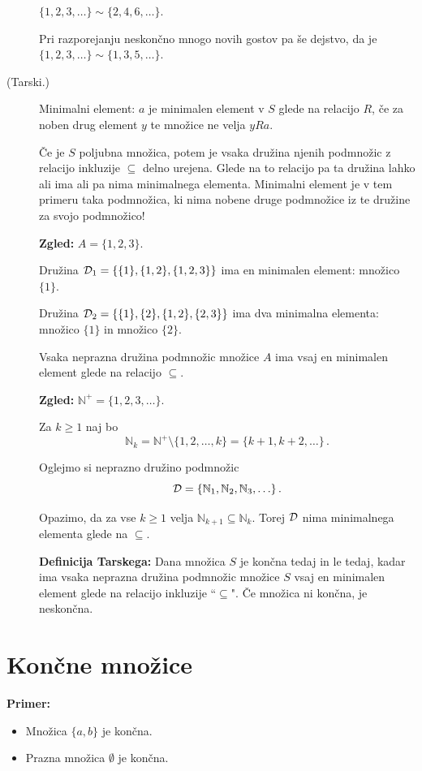 \documentclass[11pt,paper=b5,footinclude,headinclude]{scrbook} %
\begin{document}
\begin{description}
  $\{1,2,3,\ldots\}\sim\{2,4,6,\ldots\}$.

  Pri razporejanju neskončno mnogo novih gostov pa še dejstvo, da je
  $\{1,2,3,\ldots\}\sim \{1,3,5,\ldots\}$.
  \item[(Tarski.)] Minimalni element: $a$ je minimalen element v $S$ glede na relacijo $R$, če za noben drug element $y$ te množice ne velja $yRa$.

      Če je $S$ poljubna množica, potem je vsaka družina njenih podmnožic z relacijo inkluzije $\subseteq$ delno urejena. Glede na to relacijo pa ta družina lahko ali ima ali pa nima minimalnega elementa. Minimalni element je v tem primeru taka podmnožica, ki nima nobene druge podmnožice iz te družine za svojo podmnožico!

      \textbf{Zgled:} $A = \{1,2,3\}$.

      Družina ${\cal D}_1 = \{\{1\}, \{1,2\}, \{1,2,3\}\}$ ima en minimalen element: množico $\{1\}$.

      Družina ${\cal D}_2 = \{\{1\}, \{2\}, \{1,2\}, \{2,3\}\}$ ima dva minimalna elementa: množico $\{1\}$ in množico $\{2\}$.

      Vsaka neprazna družina podmnožic množice $A$ ima vsaj en minimalen element glede na relacijo $\subseteq$.

      \textbf{Zgled:} $\mathbb{N}^+ = \{1,2,3,\ldots\}$.

      Za $k\ge 1$ naj bo $$\mathbb{N}_k = \mathbb{N}^+\setminus\{1,2,\ldots, k\}= \{k+1,k+2,\ldots\}\,.$$

      Oglejmo si neprazno družino podmnožic
      $${\cal D} = \{\mathbb{N}_1,\mathbb{N}_2, \mathbb{N}_3,\ldots\}\,.$$

      Opazimo, da za vse $k\ge 1$ velja $\mathbb{N}_{k+1}\subseteq \mathbb{N}_k$. Torej ${\cal D}$ nima minimalnega elementa glede na $\subseteq$.

      \medskip
      \textbf{Definicija Tarskega:}
      Dana množica $S$ je končna tedaj in le tedaj, kadar ima vsaka neprazna družina podmnožic množice $S$ vsaj en minimalen element glede na relacijo inkluzije ``$\subseteq$". Če množica ni končna, je neskončna.
\end{description}

\section{Končne množice}
\textbf{Primer:}
\begin{itemize}
  \item Množica $\{a,b\}$ je končna.
  \item Prazna množica $\emptyset$ je končna.
\end{itemize}
\end{document}
